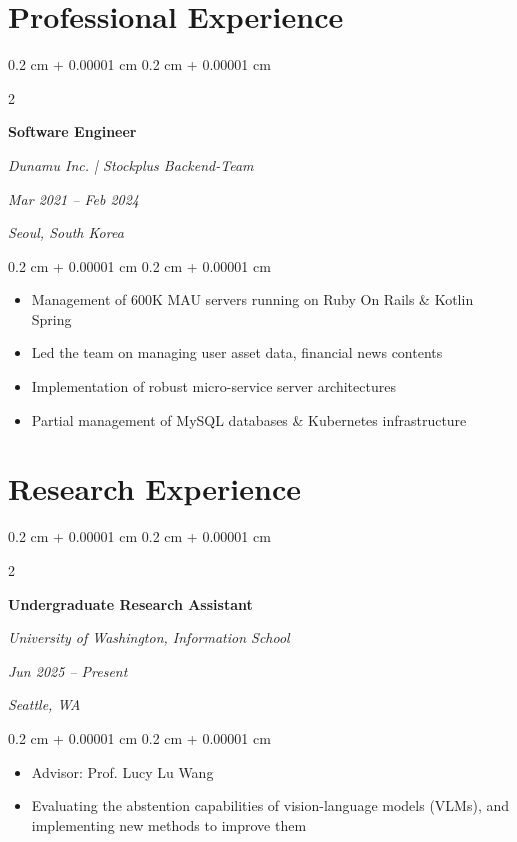 \documentclass[10pt, letterpaper]{article}
\newenvironment{highlights}{
    \begin{itemize}[
        topsep=0.10 cm,
        parsep=0.10 cm,
        partopsep=0pt,
        itemsep=0pt,
        leftmargin=0.4 cm + 10pt
    ]
}{
    \end{itemize}
} %
\newenvironment{onecolentry}{
    \begin{adjustwidth}{
        0.2 cm + 0.00001 cm
    }{
        0.2 cm + 0.00001 cm
    }
}{
    \end{adjustwidth}
} %
\newenvironment{twocolentry}[2][]{
    \onecolentry
    \def\secondColumn{#2}
    \setcolumnwidth{\fill, 4.5 cm}
    \begin{paracol}{2}
}{
    \switchcolumn \raggedleft \secondColumn
    \end{paracol}
    \endonecolentry
} %
\begin{document}
    
    \section{Professional Experience}

        \begin{twocolentry}{
        \textit{Mar 2021 – Feb 2024}    
            
        \textit{Seoul, South Korea}}
            \textbf{Software Engineer}
            
            \textit{Dunamu Inc. | Stockplus Backend-Team}
        \end{twocolentry}

        \vspace{0.10 cm}
        \begin{onecolentry}
            \begin{highlights}
                \item Management of 600K MAU servers running on Ruby On Rails \& Kotlin Spring
                \item Led the team on managing user asset data, financial news contents
                \item Implementation of robust micro-service server architectures
                \item Partial management of MySQL databases \& Kubernetes infrastructure
            \end{highlights}
        \end{onecolentry}


    \section{Research Experience}

        \begin{twocolentry}{
        \textit{Jun 2025 – Present}
        
        \textit{Seattle, WA}}
            \textbf{Undergraduate Research Assistant}

            \textit{University of Washington, Information School}
        \end{twocolentry}

        \vspace{0.10 cm}
        \begin{onecolentry}
            \begin{highlights}
                \item Advisor: Prof. Lucy Lu Wang
                \item Evaluating the abstention capabilities of vision-language models (VLMs), and implementing new methods to improve them
            \end{highlights}
        \end{onecolentry}
\end{document}
